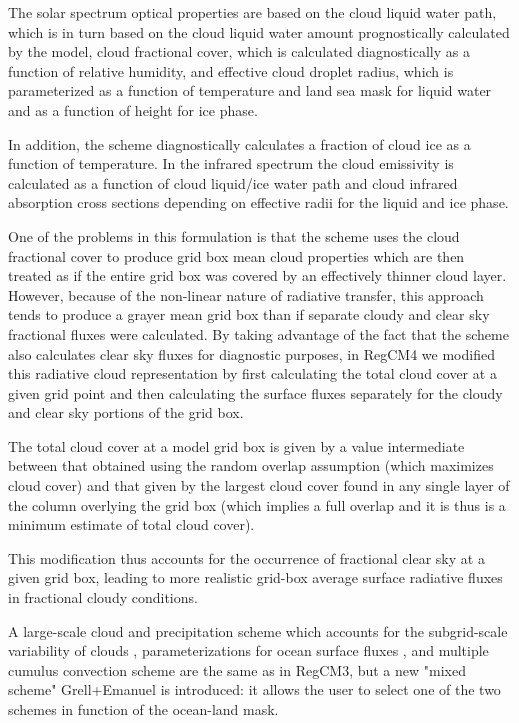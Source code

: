 The solar spectrum optical properties are based on the cloud liquid water path,
which is in turn based on the cloud liquid water amount prognostically
calculated by the model, cloud fractional cover, which is calculated
diagnostically as a function of relative humidity, and effective cloud droplet
radius, which is parameterized as a function of temperature and land sea mask
for liquid water and as a function of height for ice phase.

In addition, the scheme diagnostically calculates a fraction of cloud ice as a
function of temperature. In the infrared spectrum the cloud emissivity is
calculated as a function of cloud liquid/ice water path and cloud infrared
absorption cross sections depending on effective radii for the liquid and ice
phase.

One of the problems in this formulation is that the scheme uses the cloud
fractional cover to produce grid box mean cloud properties which are then
treated as if the entire grid box was covered by an effectively thinner
cloud layer. However, because of the non-linear nature of radiative transfer,
this approach tends to produce a grayer mean grid box than if separate
cloudy and clear sky fractional fluxes were calculated. By taking advantage
of the fact that the scheme also calculates clear sky fluxes for diagnostic
purposes, in \ac{RegCM}4 we modified this radiative cloud representation by
first calculating the total cloud cover at a given grid point and then
calculating the surface fluxes separately for the cloudy and clear sky
portions of the grid box.

The total cloud cover at a model grid box is given by a value
intermediate between that obtained using the random overlap assumption
(which maximizes cloud cover) and that given by the largest cloud cover
found in any single layer of the column overlying the grid box (which implies
a full overlap and it is thus is a minimum estimate of total cloud cover).

This modification thus accounts for the occurrence of fractional clear sky at
a given grid box, leading to more realistic grid-box average surface radiative
fluxes in fractional cloudy conditions.

A large-scale cloud and precipitation scheme which accounts for the
subgrid-scale variability of clouds \citep{Pal_00}, parameterizations for
ocean surface fluxes \citep{Zeng_98}, and multiple cumulus convection scheme
\citep{Anthes_77,Grell_93,Emanuel_91,Emanuel_99} are the same as in \ac{RegCM}3,
but a new "mixed scheme" Grell+Emanuel is introduced: it allows the user to
select one of the two schemes in function of the ocean-land mask.

